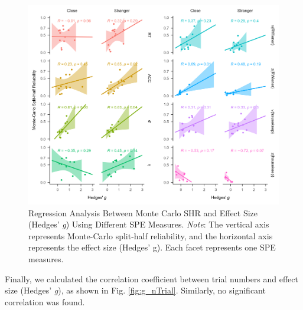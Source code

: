 \documentclass[sn-apa]{sn-jnl}%
\theoremstyle{thmstyleone}%
\theoremstyle{thmstyletwo}%
\theoremstyle{thmstylethree}%
\begin{document}
\begin{figure}[!ht]
	\centering
	\includegraphics[width=1\textwidth]{./Figure/Fig8_yi&r.png}
	\caption[Regression Analysis Between Monte Carlo SHR and Effect Size (Hedges’ \textit{g}) Using Different SPE Measures]{Regression Analysis Between Monte Carlo SHR and Effect Size (Hedges’ \textit{g}) Using Different SPE Measures. \textit{Note}: The vertical axis represents Monte-Carlo split-half reliability, and the horizontal axis represents the effect size (Hedges’ g). Each facet represents one SPE measures.
	}\label{fig:g_r}
\end{figure}
\clearpage

Finally, we calculated the correlation coefficient between trial numbers and effect size (Hedges’ \textit{g}), as shown in Fig. \ref{fig:g_nTrial}. Similarly, no significant correlation was found.
\end{document}
